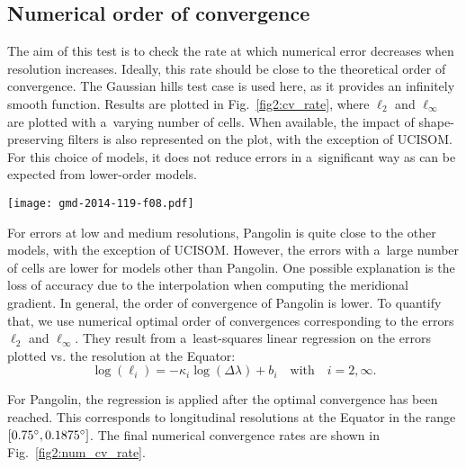 \subsection{Numerical order of convergence}
   \label{subsec:conv}

   The aim of this test is to check the rate at which numerical error decreases
   when resolution increases. Ideally, this rate should be close to
   the theoretical order of convergence. The Gaussian hills test case is
   used here, as it provides an infinitely smooth function. Results
   are plotted in Fig.~\ref{fig2:cv_rate}, where $\ell_2$ and
   $\ell_{\infty}$ are plotted with a~varying number of cells.  When
   available, the impact of shape-preserving filters is also
   represented on the plot, with the exception of UCISOM. For this
   choice of models, it does not reduce errors in a~significant way as
   can be expected from lower-order models.

\begin{figure*}[t]
  \centering
\texttt{[image: gmd-2014-119-f08.pdf]}
\caption{Numerical order of convergence for both error measures. These are computed using
  Gaussian hills after a~full rotation. When available, the models are shown
  with and without the shape-preserving limiters.}
\label{fig2:cv_rate}
\end{figure*}



   For errors at low and medium resolutions, Pangolin is quite close to
   the other models, with the exception of UCISOM. However, the errors
   with a~large number of cells are lower for models other than
   Pangolin. One possible explanation is the loss of accuracy due to
   the interpolation when computing the meridional gradient. In
   general, the order of convergence of Pangolin is lower. To quantify
   that, we use numerical optimal order of convergences corresponding to
   the errors $\ell_2$ and $\ell_{\infty}$. They result from
   a~least-squares linear regression on the errors plotted vs. the
   resolution at the Equator:
\begin{equation*}
  \log(\ell_i) = -\kappa_i \log(\Delta\lambda) + b_i
  \quad \text{with} \quad i=2,\infty.
   \end{equation*}

   For Pangolin, the regression is applied after the optimal
   convergence has been reached. This corresponds to longitudinal
   resolutions at the Equator in the range
   $[0.75^{\circ},0.1875^{\circ}]$. The final numerical convergence
   rates are shown in Fig.~\ref{fig2:num_cv_rate}.

